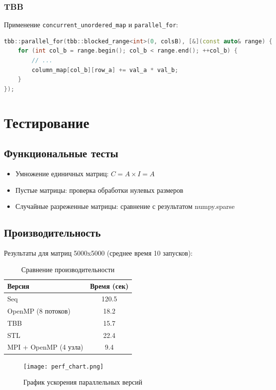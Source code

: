 \documentclass[12pt]{article}
\begin{document}
\subsubsection{TBB}
Применение \texttt{concurrent\_unordered\_map} и \texttt{parallel\_for}:
\begin{lstlisting}[language=C++, caption=Фрагмент кода TBB]
tbb::parallel_for(tbb::blocked_range<int>(0, colsB), [&](const auto& range) {
    for (int col_b = range.begin(); col_b < range.end(); ++col_b) {
        // ...
        column_map[col_b][row_a] += val_a * val_b;
    }
});
\end{lstlisting}

\section{Тестирование}
\subsection{Функциональные тесты}
\begin{itemize}
    \item Умножение единичных матриц: \( C = A \times I = A \)
    \item Пустые матрицы: проверка обработки нулевых размеров
    \item Случайные разреженные матрицы: сравнение с результатом numpy.sparse
\end{itemize}

\subsection{Производительность}
Результаты для матриц 5000x5000 (среднее время 10 запусков):
\begin{table}[h]
\centering
\begin{tabular}{|l|c|}
\hline
Версия & Время (сек) \\ \hline
Seq & 120.5 \\ \hline
OpenMP (8 потоков) & 18.2 \\ \hline
TBB & 15.7 \\ \hline
STL & 22.4 \\ \hline
MPI + OpenMP (4 узла) & 9.4 \\ \hline
\end{tabular}
\caption{Сравнение производительности}
\end{table}

\begin{figure}[h]
\centering
\texttt{[image: perf\_chart.png]}
\caption{График ускорения параллельных версий}
\end{figure}
\end{document}
